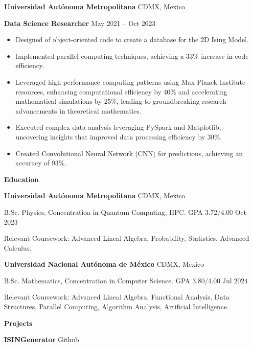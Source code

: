 \documentclass[6pt]{article}
\begin{document}
\vspace{12pt}

\textbf{Universidad Autónoma Metropolitana} \hfill CDMX, Mexico

\textbf{Data Science Researcher} \hfill May 2021 – Oct 2023
\begin{itemize}[noitemsep, topsep=0pt, partopsep=0pt, parsep=0pt]
    \item Designed of object-oriented code to create a database for the 2D Ising Model.
    \item Implemented parallel computing techniques, achieving a 33\% increase in code efficiency.
    \item Leveraged high-performance computing patterns using Max Planck Institute resources, enhancing computational efficiency by 40\% and accelerating mathematical simulations by 25\%, leading to groundbreaking research advancements in theoretical mathematics.
    \item Executed complex data analysis leveraging PySpark and Matplotlib, uncovering insights that improved data processing efficiency by 30\%.
    \item Created Convolutional Neural Network (CNN) for predictions, achieving an accuracy of 93\%.
\end{itemize}

\begin{center}
    \textbf{Education}
\end{center}
\textbf{Universidad Autónoma Metropolitana} \hfill CDMX, Mexico

B.Sc. Physics, Concentration in Quantum Computing, HPC. GPA 3.72/4.00 \hfill Oct 2023

Relevant Coursework: Advanced Lineal Algebra, Probability, Statistics, Advanced Calculus.

\vspace{12pt}

\textbf{Universidad Nacional Autónoma de México} \hfill CDMX, Mexico

B.Sc. Mathematics, Concentration in Computer Science. GPA 3.80/4.00 \hfill Jul 2024

Relevant Coursework: Advanced Lineal Algebra, Functional Analysis, Data Structures, Parallel Computing, Algorithm Analysis, Artificial Intelligence.

\vspace{12pt}
\begin{center}
    \textbf{Projects}
\end{center}
\textbf{ISINGenerator} \hfill Github
\end{document}
